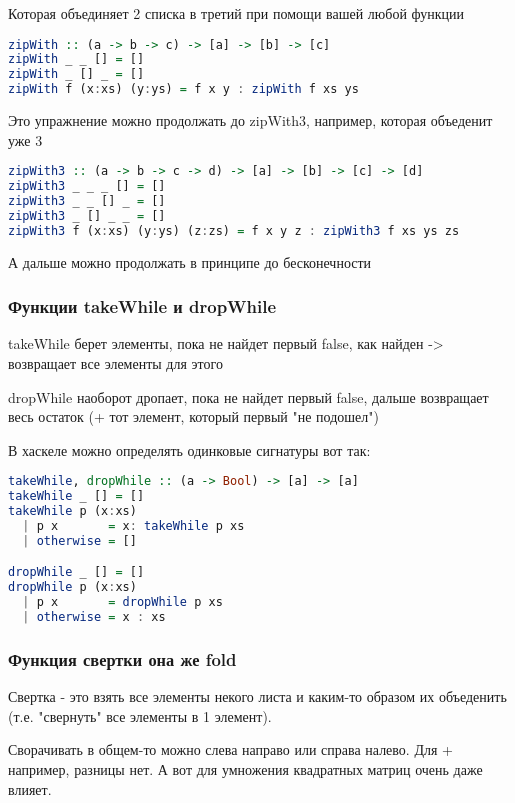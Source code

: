 \documentclass[10pt, a4paper]{article}
\begin{document}
Которая объединяет 2 списка в третий при помощи вашей любой функции

\begin{lstlisting}[language=haskell]
zipWith :: (a -> b -> c) -> [a] -> [b] -> [c]
zipWith _ _ [] = []
zipWith _ [] _ = []
zipWith f (x:xs) (y:ys) = f x y : zipWith f xs ys
\end{lstlisting}

Это упражнение можно продолжать до zipWith3, например, которая объеденит уже 3 

\begin{lstlisting}[language=haskell]
zipWith3 :: (a -> b -> c -> d) -> [a] -> [b] -> [c] -> [d]
zipWith3 _ _ _ [] = []
zipWith3 _ _ [] _ = []
zipWith3 _ [] _ _ = []
zipWith3 f (x:xs) (y:ys) (z:zs) = f x y z : zipWith3 f xs ys zs
\end{lstlisting}

А дальше можно продолжать в принципе до бесконечности


\subsubsection{Функции takeWhile и dropWhile}


takeWhile берет элементы, пока не найдет первый false, как найден -> возвращает все элементы для этого

dropWhile наоборот дропает, пока не найдет первый false, дальше возвращает весь остаток (+ тот элемент, который первый "не подошел")

В хаскеле можно определять одинковые сигнатуры вот так:

\begin{lstlisting}[language=haskell]
takeWhile, dropWhile :: (a -> Bool) -> [a] -> [a]
takeWhile _ [] = []
takeWhile p (x:xs) 
  | p x       = x: takeWhile p xs
  | otherwise = []

dropWhile _ [] = []
dropWhile p (x:xs)
  | p x       = dropWhile p xs
  | otherwise = x : xs
\end{lstlisting}

\subsubsection{Функция свертки она же fold}

Свертка - это взять все элементы некого листа и каким-то образом их объеденить (т.е. "свернуть" все элементы в 1 элемент).

Сворачивать в общем-то можно слева направо или справа налево. Для + например, разницы нет. А вот для умножения квадратных матриц очень даже влияет.
\end{document}
